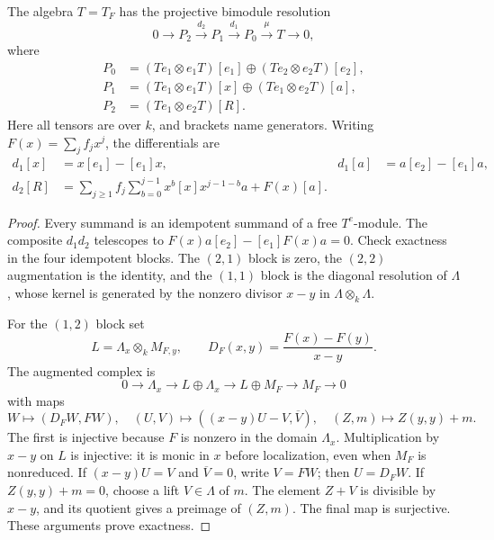 \begin{theorem}\label{cycen:thm:resolution}
The algebra $T=T_F$ has the projective bimodule resolution
\[
 0\longrightarrow P_2\xrightarrow{d_2}P_1
 \xrightarrow{d_1}P_0\xrightarrow{\mu}T\longrightarrow0,
\]
where
\[
 \begin{aligned}
 P_0&=(Te_1\otimes e_1T)[e_1]\oplus(Te_2\otimes e_2T)[e_2],\\
 P_1&=(Te_1\otimes e_1T)[x]\oplus(Te_1\otimes e_2T)[a],\\
 P_2&=(Te_1\otimes e_2T)[R].
 \end{aligned}
\]
Here all tensors are over $k$, and brackets name generators.
Writing $F(x)=\sum_j f_jx^j$, the differentials are
\begin{equation}\label{cycen:eq:resolution-differentials}
 \begin{aligned}
 d_1[x]&=x[e_1]-[e_1]x,&
 d_1[a]&=a[e_2]-[e_1]a,\\
 d_2[R]&=\sum_{j\geq1}f_j\sum_{b=0}^{j-1}
             x^b[x]x^{j-1-b}a+F(x)[a].
 \end{aligned}
\end{equation}
\end{theorem}
\begin{proof}
Every summand is an idempotent summand of a free $T^e$-module.
The composite $d_1d_2$ telescopes to
$F(x)a[e_2]-[e_1]F(x)a=0$. Check exactness in the four
idempotent blocks. The $(2,1)$ block is zero, the $(2,2)$
augmentation is the identity, and the $(1,1)$ block is the
diagonal resolution of $\Lambda$, whose kernel is generated
by the nonzero divisor $x-y$ in $\Lambda\otimes_k\Lambda$.

For the $(1,2)$ block set
\[
 L=\Lambda_x\otimes_k M_{F,y},\qquad
 D_F(x,y)=\frac{F(x)-F(y)}{x-y}.
\]
The augmented complex is
\[
 0\longrightarrow\Lambda_x\longrightarrow L\oplus\Lambda_x
 \longrightarrow L\oplus M_F\longrightarrow M_F\longrightarrow0
\]
with maps
\[
 W\longmapsto(D_FW,FW),\quad
 (U,V)\longmapsto((x-y)U-V,\overline V),\quad
 (Z,m)\longmapsto Z(y,y)+m.
\]
The first is injective because $F$ is nonzero in the domain
$\Lambda_x$. Multiplication by $x-y$ on $L$ is injective:
it is monic in $x$ before localization, even when $M_F$ is
nonreduced. If $(x-y)U=V$ and $\overline V=0$, write
$V=FW$; then $U=D_FW$. If $Z(y,y)+m=0$, choose a lift
$V\in\Lambda$ of $m$. The element $Z+V$ is divisible by
$x-y$, and its quotient gives a preimage of $(Z,m)$.
The final map is surjective. These arguments prove exactness.
\end{proof}

